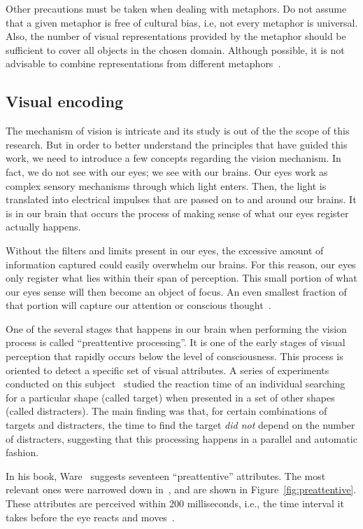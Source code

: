 Other precautions must be taken when dealing with metaphors. Do not assume that
a given metaphor is free of cultural bias, i.e, not every metaphor is universal.
Also, the number of visual representations provided by the metaphor should be
sufficient to cover all objects in the chosen domain. Although possible, it is
not advisable to combine representations from different
metaphors~\cite{diehl2007software}.

\subsection{Visual encoding}

The mechanism of vision is intricate and its study is out of the the scope of
this research. But in order to better understand the principles that have guided this
work, we need to introduce a few concepts regarding the vision mechanism. In
fact, we do not see with our eyes; we see with our brains. Our eyes work as
complex sensory mechanisms through which light enters. Then, the light is
translated into electrical impulses that are passed on to and around our brains.
It is in our brain that occurs the process of making sense of what our eyes
register actually happens.

Without the filters and limits present in our eyes, the excessive amount of
information captured could easily overwhelm our brains. For this reason, our
eyes only register what lies within their span of perception. This small portion
of what our eyes sense will then become an object of focus. An even smallest
fraction of that portion will capture our attention or conscious
thought~\cite{wandell1995foundations}.

One of the several stages that happens in our brain when performing the vision
process is called ``preattentive processing''.
It is one of the early stages of visual perception that rapidly occurs below the
level of consciousness. This process is oriented to detect a specific set of
visual attributes.
A series of experiments conducted on this subject~\cite{treisman1988feature}
studied the reaction time of an individual searching for a particular shape
(called target) when presented in a set of other shapes (called distracters).
The main finding was that, for certain combinations of targets and distracters,
the time to find the target \textit{did not} depend on the number of
distracters, suggesting that this processing happens in a parallel and automatic
fashion.

In his book, Ware~\cite{ware2008visual} suggests seventeen ``preattentive''
attributes. The most relevant ones were narrowed down
in~\cite{few2006information}, and are shown in Figure~\ref{fig:preattentive}.
These attributes are perceived within 200 milliseconds, i.e., the time interval
it takes before the eye reacts and moves~\cite{healey1996high}.

